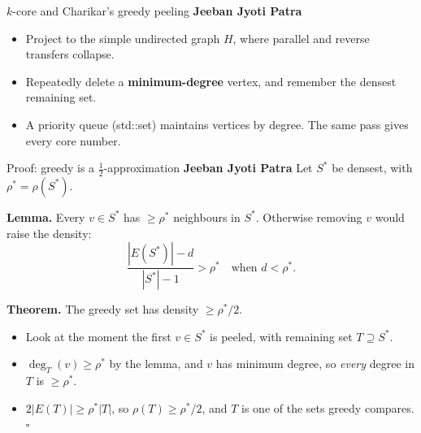 \documentclass[aspectratio=169,11pt]{beamer}
\newcommand{\memberbadge}[1]{%
  \hfill{\small\bfseries\color{memberred}#1}%
}
\begin{document}
\begin{frame}{$k$-core and Charikar's greedy peeling \memberbadge{Jeeban Jyoti Patra}}
\begin{itemize}
\setlength{\itemsep}{0.5em}
\item Project to the simple undirected graph $H$, where parallel and reverse transfers collapse.
\item Repeatedly delete a \textbf{minimum-degree} vertex, and remember the densest remaining set.
\item A priority queue (std::set) maintains vertices by degree. The same pass gives every core number.
\end{itemize}

\vspace{0.45cm}
\centering
{}
\end{frame}

\begin{frame}{Proof: greedy is a $\frac{1}{2}$-approximation \memberbadge{Jeeban Jyoti Patra}}
Let $S^*$ be densest, with $\rho^* = \rho(S^*)$.

\vspace{0.25cm}
\textbf{Lemma.} Every $v \in S^*$ has $\ge \rho^*$ neighbours in $S^*$. Otherwise removing $v$ would raise the density:
\[
\frac{|E(S^*)| - d}{|S^*| - 1} > \rho^* \quad \text{when } d < \rho^*.
\]

\textbf{Theorem.} The greedy set has density $\ge \rho^*/2$.
\begin{itemize}
\setlength{\itemsep}{0.4em}
\item Look at the moment the first $v \in S^*$ is peeled, with remaining set $T \supseteq S^*$.
\item $\deg_T(v) \ge \rho^*$ by the lemma, and $v$ has minimum degree, so \emph{every} degree in $T$ is $\ge \rho^*$.
\item $2|E(T)| \ge \rho^* |T|$, so $\rho(T) \ge \rho^*/2$, and $T$ is one of the sets greedy compares. \hfill$\square$
\end{itemize}
\end{frame}
\end{document}
